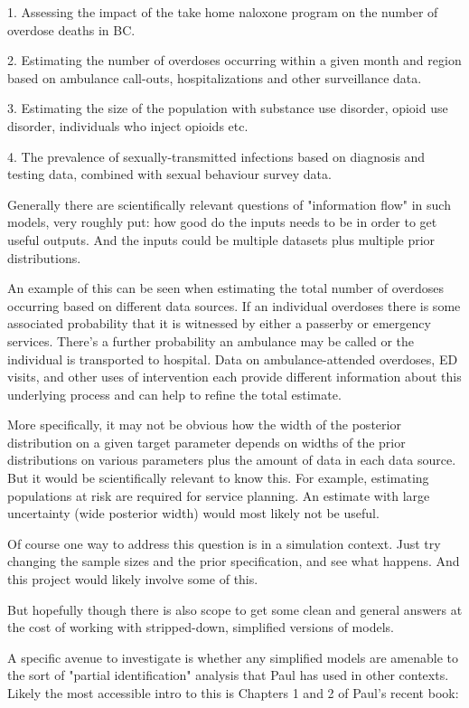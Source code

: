 \documentclass[
10pt, %
a4paper, %
oneside, %
headinclude,footinclude, %
BCOR5mm, %
]{scrartcl}
\begin{document}
\begin{enumerate}
	1. Assessing the impact of the take home naloxone program on the number of overdose deaths in BC.
	
	2. Estimating the number of overdoses occurring within a given month and region based on ambulance call-outs, hospitalizations and other surveillance data.
	
	3. Estimating the size of the population with substance use disorder, opioid use disorder, individuals who inject opioids etc.
	
	4. The prevalence of sexually-transmitted infections based on diagnosis and testing data, combined with sexual behaviour survey data.
	
	Generally there are scientifically relevant questions of "information flow" in such models, very roughly put: how good do the inputs needs to be in order to get useful outputs. And the inputs could be multiple datasets plus multiple prior distributions.
	
	An example of this can be seen when estimating the total number of overdoses occurring based on different data sources. If an individual overdoses there is some associated probability that it is witnessed by either a passerby or emergency services. There’s a further probability an ambulance may be called or the individual is transported to hospital. Data on ambulance-attended overdoses, ED visits, and other uses of intervention each provide different information about this underlying process and can help to refine the total estimate.
	
	More specifically, it may not be obvious how the width of the posterior distribution on a given target parameter depends on widths of the prior distributions on various parameters plus the amount of data in each data source. But it would be scientifically relevant to know this. For example, estimating populations at risk are required for service planning. An estimate with large uncertainty (wide posterior width) would most likely not be useful. 
	
	Of course one way to address this question is in a simulation context. Just try changing the sample sizes and the prior specification, and see what happens. And this project would likely involve some of this.
	
	But hopefully though there is also scope to get some clean and general answers at the cost of working with stripped-down, simplified versions of models.
	
	A specific avenue to investigate is whether any simplified models are amenable to the sort of "partial identification" analysis that Paul has used in other contexts. Likely the most accessible intro to this is Chapters 1 and 2 of Paul's recent book:
	

\end{enumerate}
\end{document}
